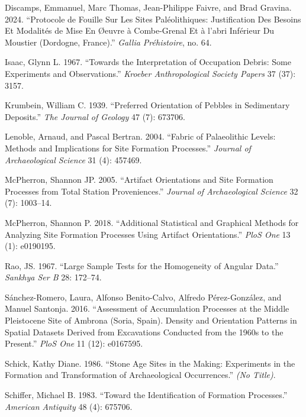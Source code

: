 \documentclass[
]{article}
\newlength{\cslhangindent}
\newenvironment{CSLReferences}[2] %
 {\begin{list}{}{%
  \setlength{\itemindent}{0pt}
  \setlength{\leftmargin}{0pt}
  \setlength{\parsep}{0pt}
  \ifodd #1
   \setlength{\leftmargin}{\cslhangindent}
   \setlength{\itemindent}{-1\cslhangindent}
  \fi
  \setlength{\itemsep}{#2\baselineskip}}}
 {\end{list}}
\begin{document}
\begin{CSLReferences}{1}{0}
Discamps, Emmanuel, Marc Thomas, Jean-Philippe Faivre, and Brad Gravina.
2024. {``Protocole de Fouille Sur Les Sites Paléolithiques:
Justification Des Besoins Et Modalités de Mise En Øeuvre à Combe-Grenal
Et à l{'}abri Inférieur Du Moustier (Dordogne, France).''} \emph{Gallia
Préhistoire}, no. 64.

Isaac, Glynn L. 1967. {``Towards the Interpretation of Occupation
Debris: Some Experiments and Observations.''} \emph{Kroeber
Anthropological Society Papers} 37 (37): 3157.

Krumbein, William C. 1939. {``Preferred Orientation of Pebbles in
Sedimentary Deposits.''} \emph{The Journal of Geology} 47 (7): 673706.

Lenoble, Arnaud, and Pascal Bertran. 2004. {``Fabric of Palaeolithic
Levels: Methods and Implications for Site Formation Processes.''}
\emph{Journal of Archaeological Science} 31 (4): 457469.

McPherron, Shannon JP. 2005. {``Artifact Orientations and Site Formation
Processes from Total Station Proveniences.''} \emph{Journal of
Archaeological Science} 32 (7): 1003--14.

McPherron, Shannon P. 2018. {``Additional Statistical and Graphical
Methods for Analyzing Site Formation Processes Using Artifact
Orientations.''} \emph{PloS One} 13 (1): e0190195.

Rao, JS. 1967. {``Large Sample Tests for the Homogeneity of Angular
Data.''} \emph{Sankhya Ser B} 28: 172--74.

Sánchez-Romero, Laura, Alfonso Benito-Calvo, Alfredo Pérez-González, and
Manuel Santonja. 2016. {``Assessment of Accumulation Processes at the
Middle Pleistocene Site of Ambrona (Soria, Spain). Density and
Orientation Patterns in Spatial Datasets Derived from Excavations
Conducted from the 1960s to the Present.''} \emph{PloS One} 11 (12):
e0167595.

Schick, Kathy Diane. 1986. {``Stone Age Sites in the Making: Experiments
in the Formation and Transformation of Archaeological Occurrences.''}
\emph{(No Title)}.

Schiffer, Michael B. 1983. {``Toward the Identification of Formation
Processes.''} \emph{American Antiquity} 48 (4): 675706.


\end{CSLReferences}
\end{document}
